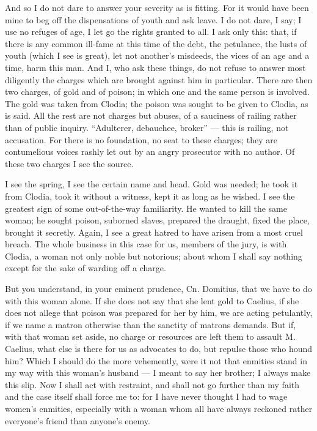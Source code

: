 And so I do not dare to answer your severity as is fitting. For it would have been mine to beg off the dispensations of youth and ask leave. I do not dare, I say; I use no refuges of age, I let go the rights granted to all. I ask only this: that, if there is any common ill-fame at this time of the debt, the petulance, the lusts of youth (which I see is great), let not another's misdeeds, the vices of an age and a time, harm this man. And I, who ask these things, do not refuse to answer most diligently the charges which are brought against him in particular. There are then two charges, of gold and of poison; in which one and the same person is involved. The gold was taken from Clodia; the poison was sought to be given to Clodia, as is said. All the rest are not charges but abuses, of a sauciness of railing rather than of public inquiry. ``Adulterer, debauchee, broker'' --- this is railing, not accusation. For there is no foundation, no seat to these charges; they are contumelious voices rashly let out by an angry prosecutor with no author. Of these two charges I see the source.

 I see the spring, I see the certain name and head. Gold was needed; he took it from Clodia, took it without a witness, kept it as long as he wished. I see the greatest sign of some out-of-the-way familiarity. He wanted to kill the same woman; he sought poison, suborned slaves, prepared the draught, fixed the place, brought it secretly. Again, I see a great hatred to have arisen from a most cruel breach. The whole business in this case for us, members of the jury, is with Clodia, a woman not only noble but notorious; about whom I shall say nothing except for the sake of warding off a charge.

 But you understand, in your eminent prudence, Cn. Domitius, that we have to do with this woman alone. If she does not say that she lent gold to Caelius, if she does not allege that poison was prepared for her by him, we are acting petulantly, if we name a matron otherwise than the sanctity of matrons demands. But if, with that woman set aside, no charge or resources are left them to assault M. Caelius, what else is there for us as advocates to do, but repulse those who hound him? Which I should do the more vehemently, were it not that enmities stand in my way with this woman's husband --- I meant to say her brother; I always make this slip. Now I shall act with restraint, and shall not go further than my faith and the case itself shall force me to: for I have never thought I had to wage women's enmities, especially with a woman whom all have always reckoned rather everyone's friend than anyone's enemy.

